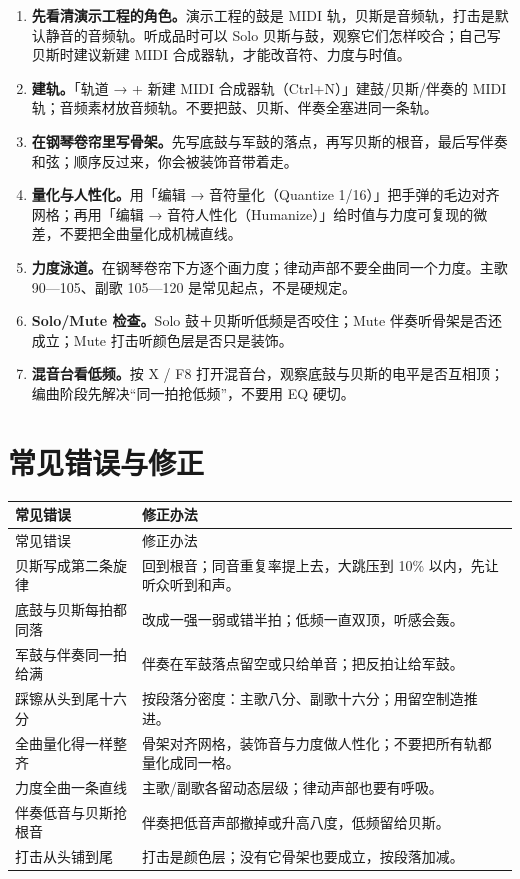 \begin{enumerate}
\item \textbf{先看清演示工程的角色。}演示工程的鼓是 MIDI 轨，贝斯是音频轨，打击是默认静音的音频轨。听成品时可以 Solo 贝斯与鼓，观察它们怎样咬合；自己写贝斯时建议新建 MIDI 合成器轨，才能改音符、力度与时值。
\item \textbf{建轨。}「轨道 → + 新建 MIDI 合成器轨（Ctrl+N）」建鼓/贝斯/伴奏的 MIDI 轨；音频素材放音频轨。不要把鼓、贝斯、伴奏全塞进同一条轨。
\item \textbf{在钢琴卷帘里写骨架。}先写底鼓与军鼓的落点，再写贝斯的根音，最后写伴奏和弦；顺序反过来，你会被装饰音带着走。
\item \textbf{量化与人性化。}用「编辑 → 音符量化（Quantize 1/16）」把手弹的毛边对齐网格；再用「编辑 → 音符人性化（Humanize）」给时值与力度可复现的微差，不要把全曲量化成机械直线。
\item \textbf{力度泳道。}在钢琴卷帘下方逐个画力度；律动声部不要全曲同一个力度。主歌 90—105、副歌 105—120 是常见起点，不是硬规定。
\item \textbf{Solo/Mute 检查。}Solo 鼓＋贝斯听低频是否咬住；Mute 伴奏听骨架是否还成立；Mute 打击听颜色层是否只是装饰。
\item \textbf{混音台看低频。}按 X / F8 打开混音台，观察底鼓与贝斯的电平是否互相顶；编曲阶段先解决“同一拍抢低频”，不要用 EQ 硬切。
\end{enumerate}


\section{常见错误与修正}
\label{sec:rhythm-mistakes}

\begin{longtable}{p{}p{}}
\toprule
常见错误 & 修正办法 \\
\midrule
\endfirsthead
\toprule
常见错误 & 修正办法 \\
\midrule
\endhead
贝斯写成第二条旋律 & 回到根音；同音重复率提上去，大跳压到 10\% 以内，先让听众听到和声。 \\
底鼓与贝斯每拍都同落 & 改成一强一弱或错半拍；低频一直双顶，听感会轰。 \\
军鼓与伴奏同一拍给满 & 伴奏在军鼓落点留空或只给单音；把反拍让给军鼓。 \\
踩镲从头到尾十六分 & 按段落分密度：主歌八分、副歌十六分；用留空制造推进。 \\
全曲量化得一样整齐 & 骨架对齐网格，装饰音与力度做人性化；不要把所有轨都量化成同一格。 \\
力度全曲一条直线 & 主歌/副歌各留动态层级；律动声部也要有呼吸。 \\
伴奏低音与贝斯抢根音 & 伴奏把低音声部撤掉或升高八度，低频留给贝斯。 \\
打击从头铺到尾 & 打击是颜色层；没有它骨架也要成立，按段落加减。 \\
\bottomrule
\end{longtable}

